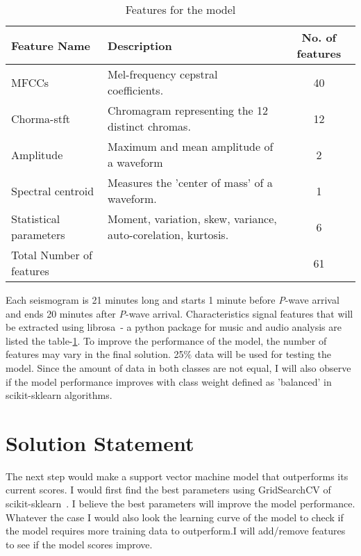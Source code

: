 \documentclass[12pt]{article}
\begin{document}
    \begin{table}[ht]
        \caption{Features for the model}
        \label{tab:feature_list}
        \begin{tabular}{l p{} c }
            \hline
            Feature Name & Description & No. of features \\
            \hline
            MFCCs & Mel-frequency cepstral coefficients. & 40\\
            Chorma-stft & Chromagram representing the 12 distinct chromas. & 12 \\
            Amplitude & Maximum and mean amplitude of a waveform & 2\\
            Spectral centroid & Measures the 'center of mass' of a waveform. & 1\\
            Statistical parameters & Moment, variation, skew, variance, auto-corelation, kurtosis. & 6 \\
            \hline
            Total Number of features & & 61 \\
            \hline
        \end{tabular}
    \end{table}

    Each seismogram is 21 minutes long and starts 1 minute before \textit{P}-wave arrival and ends 20 minutes after \textit{P}-wave arrival. Characteristics signal features that will be extracted using librosa~\citep{mcfee2015librosa}- a python package for music and audio analysis are listed the table-\ref{tab:feature_list}. To improve the performance of the model, the number of features may vary in the final solution. 25$\%$ data will be used for testing the model. Since the amount of data in both classes are not equal, I will also observe if the model performance improves with class weight defined as 'balanced' in scikit-sklearn algorithms.

    \section{Solution Statement}
    The next step would make a support vector machine model that outperforms its current scores. I would first find the best parameters using GridSearchCV of scikit-sklearn~\citep{scikit-learn}. I believe the best parameters will improve the model performance. Whatever the case I would also look the learning curve of the model to check if the model requires more training data to outperform.I will add/remove features to see if the model scores improve.
\end{document}
